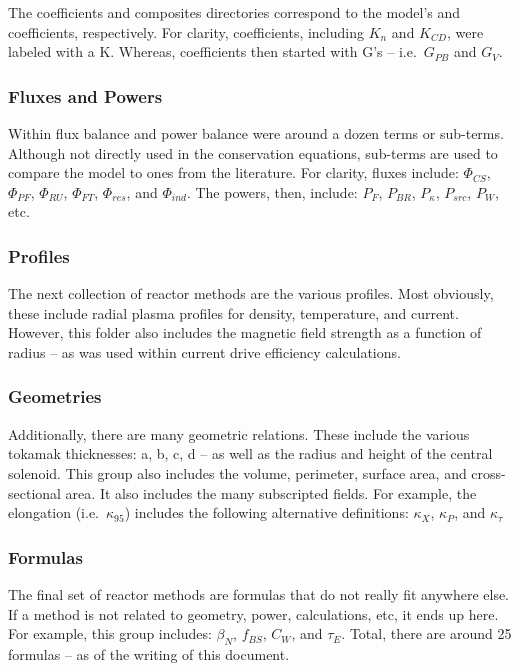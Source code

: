 The coefficients and composites directories correspond to the model's  and  coefficients, respectively. For clarity,  coefficients, including $K_n$ and $K_{CD}$, were labeled with a K. Whereas,  coefficients then started with G's -- i.e.\ $G_{PB}$ and $G_V$.

\subsubsection{Fluxes and Powers}

Within flux balance and power balance were around a dozen terms or sub-terms. Although not directly used in the conservation equations, sub-terms are used to compare the model to ones from the literature. For clarity, fluxes include: $\Phi_{CS}$, $\Phi_{PF}$, $\Phi_{RU}$, $\Phi_{FT}$, $\Phi_{res}$, and $\Phi_{ind}$. The powers, then, include: $P_F$, $P_{BR}$, $P_\kappa$, $P_{src}$, $P_W$, etc. 

\subsubsection{Profiles}

The next collection of reactor methods are the various profiles. Most obviously, these include radial plasma profiles for density, temperature, and current. However, this folder also includes the magnetic field strength as a function of radius -- as was used within current drive efficiency calculations.

\subsubsection{Geometries}

Additionally, there are many geometric relations. These include the various tokamak thicknesses: a, b, c, d -- as well as the radius and height of the central solenoid. This group also includes the volume, perimeter, surface area, and cross-sectional area. It also includes the many subscripted fields. For example, the elongation (i.e.\ $\kappa_{95}$) includes the following alternative definitions: $\kappa_X$, $\kappa_P$, and $\kappa_\tau$

\subsubsection{Formulas}

The final set of reactor methods are formulas that do not really fit anywhere else. If a method is not related to geometry, power, calculations, etc, it ends up here. For example, this group includes: $\beta_N$, $f_{BS}$, $C_W$, and $\tau_E$. Total, there are around 25 formulas -- as of the writing of this document.

